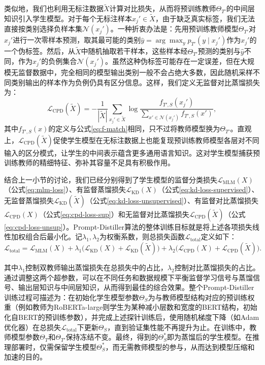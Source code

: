 \documentclass[../main.tex]{subfiles}
\begin{document}
类似地，我们也利用无标注数据$\tilde{X}$计算对比损失，从而将预训练教师$\Theta_{T'}$的中间层知识引入学生模型。对于每个无标注样本$x_j'\in \tilde{X}$，由于缺乏真实标签，我们无法直接按类别选择负样本集$\mathcal{N}(x_j')$。一种折衷办法是：先用预训练教师模型$\Theta_{T'}$对$x_j'$进行一次零样本预测，取其最可能的类别$\hat{y} = \arg\max_{y} p_{T'}(y\mid x_j')$作为$x_j'$的一个伪标签。然后，从$\tilde{X}$中随机抽取若干样本，这些样本经$\Theta_{T'}$预测的类别与$\hat{y}$不同，作为$x_j'$的负例集合$\mathcal{N}(x_j')$。虽然这种伪标签可能存在一定误差，但在大规模无监督数据中，完全相同的模型输出类别一般不会占绝大多数，因此随机采样不同类别输出的样本作为负例仍具有区分信息。这样，我们定义无监督对比蒸馏损失为：
\begin{equation}
	\label{eq:cpd-loss-unsup}
	\mathcal{L}_{\text{CPD}}(\tilde{X}) = -\frac{1}{|\tilde{X}|} \sum_{x_j' \in \tilde{X}} \log \frac{f_{T',S}(x_j')}{\displaystyle\sum_{x' \in \mathcal{N}(x_j')} f_{T',S}(x')} ,
\end{equation}
其中$f_{T',S}(x)$的定义与公式\eqref{eq:f-match}相同，只不过将教师模型换为$\Theta_{T'}$。直观上，$\mathcal{L}_{\text{CPD}}(\tilde{X})$促使学生模型在无标注数据上也能复现预训练教师模型各层对不同输入的区分模式，让学生的中间表示蕴含更多通用语言知识。这对学生模型捕获预训练教师的精细特征、弥补其容量不足具有积极作用。

\label{sec:ch3-3-3-loss-overview-and-objectives}
结合上一小节的讨论，我们已经分别得到了学生模型的监督分类损失$\mathcal{L}_{\text{MLM}}(X)$（公式\eqref{eq:mlm-loss}）、有监督蒸馏损失$\mathcal{L}_{\text{KD}}(X)$（公式\eqref{eq:kd-loss-supervised}）、无监督蒸馏损失$\mathcal{L}_{\text{KD}}(\tilde{X})$（公式\eqref{eq:kd-loss-unsupervised}）、有监督对比蒸馏损失$\mathcal{L}_{\text{CPD}}(X)$（公式\eqref{eq:cpd-loss-sup}）和无监督对比蒸馏损失$\mathcal{L}_{\text{CPD}}(\tilde{X})$（公式\eqref{eq:cpd-loss-unsup}）。Prompt-Distiller算法的整体训练目标就是将上述各项损失线性加权组合后最小化。记$\lambda_1,\lambda_2$为权衡系数，则总损失函数$\mathcal{L}_{\text{total}}$定义如下：
\begin{equation}
	\label{eq:total-loss}
	\mathcal{L}_{\text{total}} = \mathcal{L}_{\text{MLM}}(X) + \lambda_1 \Big( \mathcal{L}_{\text{KD}}(X) + \mathcal{L}_{\text{KD}}(\tilde{X}) \Big) + \lambda_2 \Big( \mathcal{L}_{\text{CPD}}(X) + \mathcal{L}_{\text{CPD}}(\tilde{X}) \Big).
\end{equation}

其中$\lambda_1$控制双教师输出蒸馏损失在总损失中的占比，$\lambda_2$控制对比蒸馏损失的占比。通过调整这两个超参数，可以在不同任务和数据规模下平衡监督学习信号与蒸馏信号、输出层知识与中间层知识，从而得到最佳的综合效果。整个Prompt-Distiller训练过程可描述为：在初始化学生模型参数$\Theta_S$为与教师模型结构对应的预训练权重（例如教师为RoBERTa-large则学生为某种减小层数和宽度的BERT结构，初始化自BERT的预训练参数），并完成上述探针训练后，使用随机梯度下降（如Adam优化器）在总损失$\mathcal{L}_{\text{total}}$下更新$\Theta_S$，直到验证集性能不再提升为止。在训练中，教师模型参数$\Theta_T$和$\Theta_{T'}$保持冻结不变。最终，得到的$\Theta_S^*$即为蒸馏后的学生模型。在推理部署时，仅需保留学生模型$\Theta_S^*$，而无需教师模型的参与，从而达到模型压缩和加速的目的。
\end{document}
